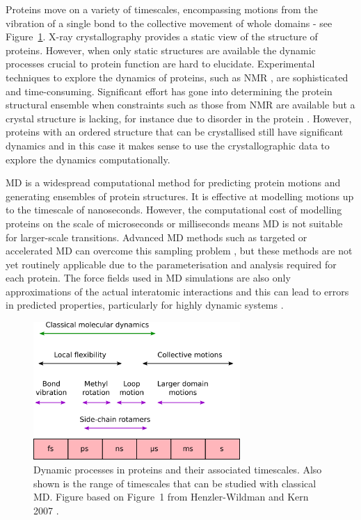 Proteins move on a variety of timescales, encompassing motions from the vibration of a single bond to the collective movement of whole domains \cite{Henzler-Wildman2007, Wei2016} - see Figure~\ref{fig:timescales}.
X-ray crystallography provides a static view of the structure of proteins.
However, when only static structures are available the dynamic processes crucial to protein function \cite{Henzler-Wildman2007a} are hard to elucidate.
Experimental techniques to explore the dynamics of proteins, such as NMR \cite{Sormanni2017}, are sophisticated and time-consuming.
Significant effort has gone into determining the protein structural ensemble when constraints such as those from NMR are available but a crystal structure is lacking, for instance due to disorder in the protein \cite{Bonomi2017}.
However, proteins with an ordered structure that can be crystallised still have significant dynamics and in this case it makes sense to use the crystallographic data to explore the dynamics computationally.

MD is a widespread computational method for predicting protein motions and generating ensembles of protein structures.
It is effective at modelling motions up to the timescale of nanoseconds.
However, the computational cost of modelling proteins on the scale of microseconds or milliseconds means MD is not suitable for larger-scale transitions.
Advanced MD methods such as targeted or accelerated MD can overcome this sampling problem \cite{Maximova2016, Ho2009}, but these methods are not yet routinely applicable due to the parameterisation and analysis required for each protein.
The force fields used in MD simulations are also only approximations of the actual interatomic interactions and this can lead to errors in predicted properties, particularly for highly dynamic systems \cite{Palazzesi2015}.


\begin{figure}
\centering

\includegraphics[width=0.7\textwidth]{figures/timescales/timescales}

\caption[Timescales of protein motions]
{Dynamic processes in proteins and their associated timescales.
Also shown is the range of timescales that can be studied with classical MD.
Figure based on Figure~1 from Henzler-Wildman and Kern 2007 \cite{Henzler-Wildman2007}.}

\label{fig:timescales}
\end{figure}


